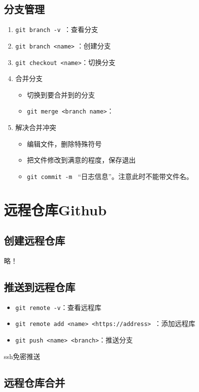 \subsection{分支管理}
\begin{enumerate}
\item \verb|git branch -v |：查看分支
\item \verb|git branch <name>| ：创建分支
\item \verb|git checkout <name>|：切换分支
\item 合并分支
\begin{itemize}
\item 切换到要合并到的分支
\item \verb|git merge <branch name>|：
\end{itemize}
\item 解决合并冲突
\begin{itemize}
\item  编辑文件，删除特殊符号
\item 把文件修改到满意的程度，保存退出
\item \verb|git commit -m | ``日志信息''。注意此时不能带文件名。
\end{itemize}
\end{enumerate}



\section{远程仓库Github}
\subsection{创建远程仓库}

略！

\subsection{推送到远程仓库}
\begin{itemize}
\item \verb|git remote -v|：查看远程库
\item \verb|git remote add <name> <https://address> |：添加远程库
\item \verb|git push <name> <branch>|：推送分支
\end{itemize}

ssh免密推送


\subsection{远程仓库合并}






